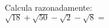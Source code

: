 \documentclass{exam}
\begin{document}
\begin{questions}

\question Calcula razonadamente:\\
    $\sqrt{18}+\sqrt{50}-\sqrt{2}-\sqrt{8}=$

\end{questions}
\end{document}
